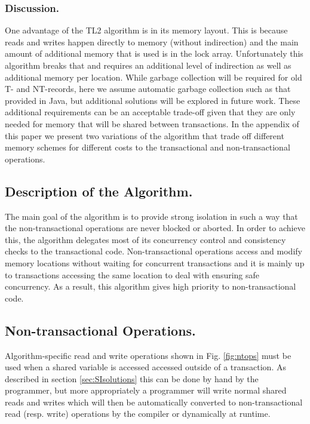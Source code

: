 \subsubsection{Discussion.}
One advantage of the TL2 algorithm is in its memory layout.
This is because reads and writes happen directly to memory (without indirection)
and the main amount of additional memory that is used is in the lock array.
Unfortunately this algorithm breaks that and requires an additional level of indirection
as well as additional memory per location.
While garbage collection will be required for old T- and NT-records, here we assume
automatic garbage collection such as that provided in Java, but additional solutions will be explored in future work.
These additional requirements can be an acceptable trade-off given that they are only
needed for memory that will be shared between transactions.
In the appendix of this paper we present two variations of the algorithm that trade
off different memory schemes for different costs to the transactional and
non-transactional operations.



\subsection{Description of the Algorithm.}

The main goal of the algorithm is to provide strong isolation 
in such a way that  the non-transactional  operations are never blocked or aborted. 
In order  to achieve this,  the algorithm delegates most of its
concurrency   control   and  consistency   checks   to  the   transactional
code. Non-transactional  
operations access and modify  memory  locations without waiting for concurrent transactions
 and it is mainly up to transactions accessing the same location to
deal with ensuring safe concurrency.  As a
result, this algorithm gives high  priority   to non-transactional code. 

\subsection{Non-transactional Operations.}
Algorithm-specific  read  and write operations
shown in Fig. \ref{fig:ntops} must be used when a shared variable is accessed
accessed outside of a transaction.
As described in section \ref{sec:SIsolutions} this can be done by hand by the programmer,
but more appropriately a programmer will write normal shared reads and writes which will then
be automatically converted to non-transactional read (resp. write) operations by
the compiler or dynamically at runtime.

